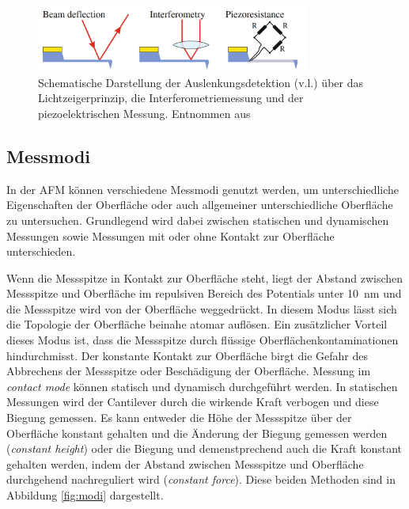           \FloatBarrier

          \begin{figure}[h]
            \centering
            \includegraphics[width = 0.8\textwidth]{pictures/detektion.png}
            \caption{Schematische Darstellung der Auslenkungsdetektion (v.l.) über das Lichtzeigerprinzip, die Interferometriemessung und der piezoelektrischen Messung. Entnommen aus \cite{park_systems_force-distance_nodate}}
            \label{fig:detektion}
          \end{figure}
        
          \FloatBarrier

      

      \newpage
      \subsection{Messmodi}
          In der AFM können verschiedene Messmodi genutzt werden, um unterschiedliche Eigenschaften der Oberfläche oder auch allgemeiner unterschiedliche Oberfläche zu untersuchen. Grundlegend wird dabei 
          zwischen statischen und dynamischen Messungen sowie Messungen mit oder ohne Kontakt zur Oberfläche unterschieden. 

          Wenn die Messspitze in Kontakt zur Oberfläche steht, liegt der Abstand zwischen Messspitze und Oberfläche im repulsiven Bereich des Potentials unter \SI{10}{\nano\metre} und die Messspitze wird von 
          der Oberfläche weggedrückt. In diesem Modus lässt sich die Topologie der Oberfläche beinahe atomar auflösen. Ein zusätzlicher Vorteil dieses Modus ist, dass die Messspitze durch flüssige 
          Oberflächenkontaminationen hindurchmisst. Der konstante Kontakt zur Oberfläche birgt die Gefahr des Abbrechens der Messspitze oder Beschädigung der Oberfläche. Messung im \textit{contact mode}
          können statisch und dynamisch durchgeführt werden. In statischen Messungen wird der Cantilever durch die wirkende Kraft verbogen und diese Biegung gemessen. Es kann entweder die Höhe der Messspitze
          über der Oberfläche konstant gehalten und die Änderung der Biegung gemessen werden (\textit{constant height}) oder die Biegung  und demenstprechend auch die Kraft konstant gehalten werden, indem
          der Abstand zwischen Messspitze und Oberfläche durchgehend nachreguliert wird (\textit{constant force}). Diese beiden Methoden sind in Abbildung \ref{fig:modi} dargestellt. 
          

